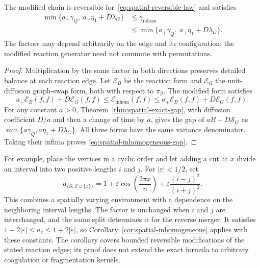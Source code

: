 \begin{corollary}
\label{cor:spatial-inhomogeneous}
The modified chain is reversible for~\eqref{eq:spatial-reversible-law}
and satisfies
\begin{equation}\label{eq:spatial-inhomogeneous-gap}
 \begin{split}
 \min\{a_-\gamma_Q,\ a_-\eta_1+D\lambda_G\}
 &\leq\gamma_{\mathrm{inhom}}\\
 &\leq\min\{a_+\gamma_Q,\ a_+\eta_1+D\lambda_G\}.
 \end{split}
\end{equation}
The factors may depend arbitrarily on the edge and its configuration;
the modified reaction generator need not commute with permutations.
\end{corollary}

\begin{proof}
Multiplication by the same factor in both directions preserves
detailed balance at each reaction edge.  Let $\mathcal E_B$ be the
reaction form and $\mathcal E_G$ the unit-diffusion graph-swap form,
both with respect to $\pi_\beta$.  The modified form satisfies
\[
 a_-\mathcal E_B(f,f)+D\mathcal E_G(f,f)
 \leq\mathcal E_{\mathrm{inhom}}(f,f)
 \leq a_+\mathcal E_B(f,f)+D\mathcal E_G(f,f).
\]
For any constant $a>0$, Theorem~\ref{thm:spatial-exact-gap}, with
diffusion coefficient $D/a$ and then a change of time by $a$, gives
the gap of $aB+D\mathcal S_G$ as
$\min\{a\gamma_Q,a\eta_1+D\lambda_G\}$.  All three forms have the
same variance denominator.  Taking their infima proves
\eqref{eq:spatial-inhomogeneous-gap}.
\end{proof}

For example, place the vertices in a cyclic order and let adding a
cut at $x$ divide an interval into two positive lengths $i$ and $j$.
For $|\varepsilon|<1/2$, set
\begin{equation}\label{eq:spatial-circle-inhomogeneity}
 a_{\{S,S\cup\{x\}\}}
 =1+\varepsilon\cos\left(\frac{2\pi x}{n}\right)
   +\varepsilon\frac{(i-j)^2}{(i+j)^2}.
\end{equation}
This combines a spatially varying environment with a dependence on
the neighboring interval lengths.  The factor is unchanged when
$i$ and $j$ are interchanged, and the same split determines it for
the reverse merger.  It satisfies
$1-2|\varepsilon|\leq a_e\leq1+2|\varepsilon|$, so
Corollary~\ref{cor:spatial-inhomogeneous} applies with these constants.
The corollary covers bounded reversible modifications of the stated
reaction edges; its proof does not extend the exact formula to
arbitrary coagulation or fragmentation kernels.
